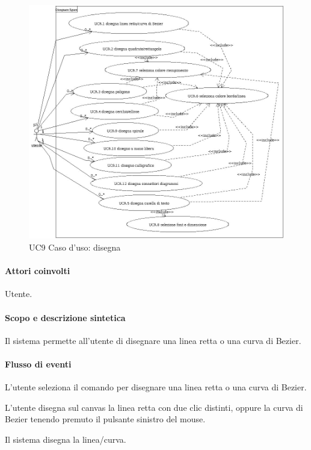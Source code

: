 \begin{figure}[!ht]
\centering
\vspace{20pt} 
\includegraphics[width=17cm]{UC9Espanso.jpg}
\caption{UC9 Caso d'uso: disegna}
\label{uc9}
\end{figure}


\paragraph{Attori coinvolti} Utente.
\paragraph{Scopo e descrizione sintetica} 
Il sistema permette all'utente di disegnare una linea retta o una curva di Bezier.
\paragraph{Flusso di eventi}
\begin{elenconumerato}[\textbf{}]{\subsubsecindent}
\item L'utente seleziona il comando per disegnare una linea retta o una curva di Bezier.
\item L'utente disegna sul canvas la linea retta con due clic distinti, oppure la curva di Bezier tenendo premuto il pulsante sinistro del mouse.
\item Il sistema disegna la linea/curva.
\end{elenconumerato}
